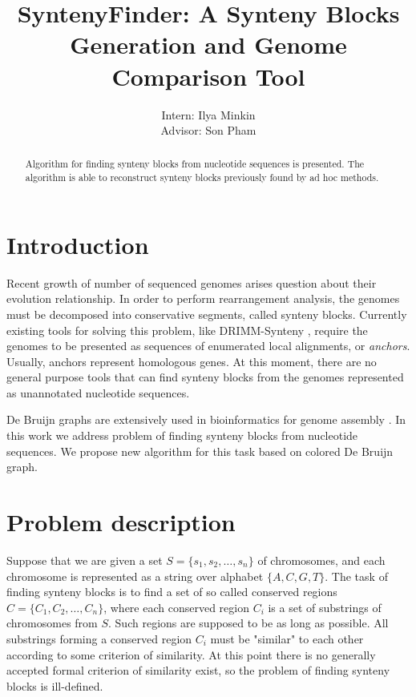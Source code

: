 \documentclass[a4paper,12pt]{scrartcl}
\begin{document}
\title{SyntenyFinder: A Synteny Blocks Generation and Genome Comparison Tool}
\author{Intern: Ilya Minkin\\
	Advisor: Son Pham}
\date{}
\maketitle

\begin{abstract}
Algorithm for finding synteny blocks from nucleotide sequences is presented. The algorithm is able to reconstruct
synteny blocks previously found by ad hoc methods.
\end{abstract}

\section{Introduction}

Recent growth of number of sequenced genomes arises question about their evolution relationship. 
In order to perform rearrangement analysis, the genomes must be decomposed into conservative segments,
called synteny blocks. Currently existing tools for solving this problem, like DRIMM-Synteny
\cite{Pham2010}, require the genomes to be presented as sequences of enumerated local alignments, or \textit{anchors}.
Usually, anchors represent homologous genes. At this moment, there are no general purpose tools that can
find synteny blocks from the genomes represented as unannotated nucleotide sequences.

De Bruijn graphs are extensively used in bioinformatics for genome assembly \cite{Pevzner2001, Iqbal2012}. 
In this work we address problem of finding synteny blocks from nucleotide sequences. We propose new 
algorithm for this task based on colored De Bruijn graph.


\section{Problem description}

Suppose that we are given a set \(S = \lbrace s_{1}, s_{2}, \ldots, s_{n} \rbrace \) of chromosomes, and each
chromosome is represented as a string over alphabet \(\lbrace A, C, G, T \rbrace \). The task of finding synteny
blocks is to find a set of so called conserved regions \(C = \lbrace C_{1}, C_{2}, \ldots , C_{n} \rbrace \), where
each conserved region \(C_{i}\) is a set of substrings of chromosomes from \(S\). Such regions are supposed 
to be as long as possible.  All substrings forming a conserved region \(C_{i}\) must be "similar" to each other
according to some criterion of similarity. At this point there is no generally accepted formal criterion of similarity exist, 
so the problem of finding synteny blocks is ill-defined.
\end{document}
